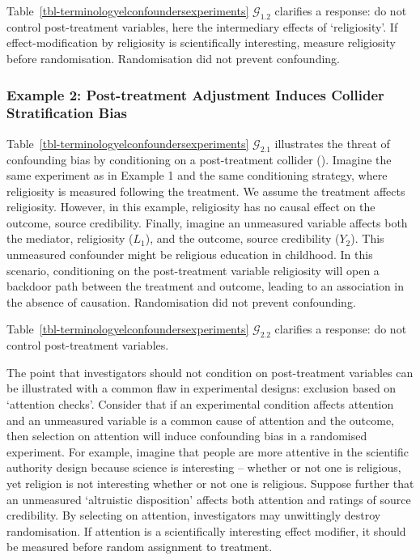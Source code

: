 \documentclass[
  single column]{article}
\begin{document}
Table~\ref{tbl-terminologyelconfoundersexperiments}
\(\mathcal{G}_{1.2}\) clarifies a response: do not control
post-treatment variables, here the intermediary effects of
`religiosity'. If effect-modification by religiosity is scientifically
interesting, measure religiosity before randomisation. Randomisation did
not prevent confounding.

\subsubsection{Example 2: Post-treatment Adjustment Induces Collider
Stratification
Bias}\label{example-2-post-treatment-adjustment-induces-collider-stratification-bias}

Table~\ref{tbl-terminologyelconfoundersexperiments}
\(\mathcal{G}_{2.1}\) illustrates the threat of confounding bias by
conditioning on a post-treatment collider (). Imagine the same experiment as in Example 1 and
the same conditioning strategy, where religiosity is measured following
the treatment. We assume the treatment affects religiosity. However, in
this example, religiosity has no causal effect on the outcome, source
credibility. Finally, imagine an unmeasured variable affects both the
mediator, religiosity (\(L_1\)), and the outcome, source credibility
(\(Y_2\)). This unmeasured confounder might be religious education in
childhood. In this scenario, conditioning on the post-treatment variable
religiosity will open a backdoor path between the treatment and outcome,
leading to an association in the absence of causation. Randomisation did
not prevent confounding.

Table~\ref{tbl-terminologyelconfoundersexperiments}
\(\mathcal{G}_{2.2}\) clarifies a response: do not control
post-treatment variables.

The point that investigators should not condition on post-treatment
variables can be illustrated with a common flaw in experimental designs:
exclusion based on `attention checks'. Consider that if an experimental
condition affects attention and an unmeasured variable is a common cause
of attention and the outcome, then selection on attention will induce
confounding bias in a randomised experiment. For example, imagine that
people are more attentive in the scientific authority design because
science is interesting -- whether or not one is religious, yet religion
is not interesting whether or not one is religious. Suppose further that
an unmeasured `altruistic disposition' affects both attention and
ratings of source credibility. By selecting on attention, investigators
may unwittingly destroy randomisation. If attention is a scientifically
interesting effect modifier, it should be measured before random
assignment to treatment.
\end{document}

